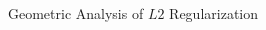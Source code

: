 \documentclass[11pt,compress,t,notes=noshow, xcolor=table]{beamer}
\begin{document}
\begin{vbframe}{Geometric Analysis of $L2$ Regularization}
\begin{columns}
      \begin{column}{0.5\textwidth}
      
      \begin{figure}
            \centering
          \end{figure}
      
      \end{column}
      
    \end{columns}

\end{vbframe}

\endlecture
\end{document}

